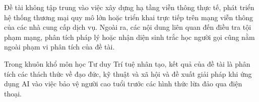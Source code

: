Đề tài không tập trung vào việc xây dựng hạ tầng viễn thông thực tế, phát triển hệ thống thương mại quy mô lớn hoặc triển khai trực tiếp trên mạng viễn thông của các nhà cung cấp dịch vụ. Ngoài ra, các nội dung liên quan đến điều tra tội phạm mạng, phân tích pháp lý hoặc nhận diện sinh trắc học người gọi cũng nằm ngoài phạm vi phân tích của đề tài.

Trong khuôn khổ môn học Tư duy Trí tuệ nhân tạo, kết quả của đề tài là phân tích các thách thức về đạo đức, kỹ thuật và xã hội và đề xuất giải pháp khi ứng dụng AI vào việc bảo vệ người cao tuổi trước các hình thức lừa đảo qua điện thoại.